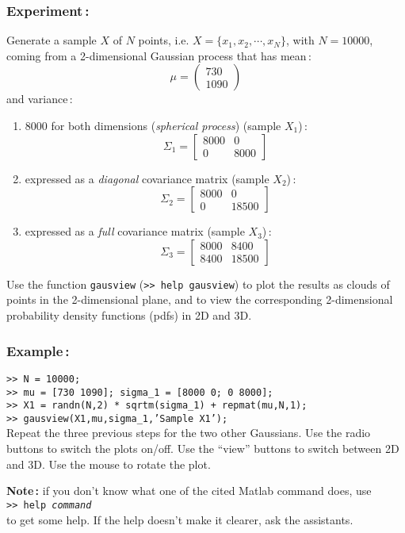\documentclass[twoside,a4paper,titlepage]{article}
\newcommand{\mat}[1]{{\tt >> #1} \\}
\newcommand{\com}[1]{{\tt #1}}
\begin{document}
\subsubsection*{Experiment\,:}
Generate a sample $X$ of $N$ points, i.e. $X=\{x_1, x_2,\cdots,x_N\}$, with
$N=10000$, coming from a 2-dimensional Gaussian process that has mean\,:
\[
\mu = \left( \begin{array}{c} 730 \\ 1090 \end{array} \right)
\]
and variance\,:
	\begin{enumerate}
	\item 8000 for both dimensions ({\em spherical process}) (sample $X_1$)\,:
		\[
		\Sigma_1 = \left[ \begin{array}{cc}
						8000 & 0 \\
						0    & 8000
						\end{array} \right]
		\]
	\item expressed as a {\em diagonal} covariance matrix (sample $X_2$)\,:
		\[
		\Sigma_2 = \left[ \begin{array}{cc}
						8000 & 0 \\
						0    & 18500
						\end{array} \right]
		\]
	\item expressed as a {\em full} covariance matrix (sample $X_3$)\,:
		\[
		\Sigma_3 = \left[ \begin{array}{cc}
						8000 & 8400 \\
						8400 & 18500
						\end{array} \right]
		\]
	\end{enumerate}
%
Use the function \com{gausview} (\com{>> help gausview}) to plot the
results as clouds of points in the 2-dimensional plane, and to view the
corresponding 2-dimensional probability density functions (pdfs) in 2D and
3D.

\subsubsection*{Example\,:}
\mat{N = 10000;}
\mat{mu = [730 1090]; sigma\_1 = [8000 0; 0 8000];}
\mat{X1 = randn(N,2) * sqrtm(sigma\_1) + repmat(mu,N,1);}
\mat{gausview(X1,mu,sigma\_1,'Sample X1');}
%
Repeat the three previous steps for the two other Gaussians. Use the radio
buttons to switch the plots on/off. Use the ``view'' buttons to switch
between 2D and 3D. Use the mouse to rotate the plot.


{\bf \noindent Note\,:} if you don't know what one of the cited {\sc Matlab}
command does, use \\
\mat{help {\it command}}
to get some help. If the help doesn't make it clearer, ask the assistants.
\end{document}
